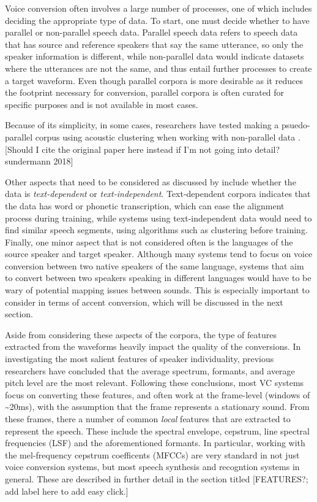 \documentclass
[
    a4paper,
    twoside,
    12pt
]
{report}
\begin{document}
Voice conversion often involves a large number of processes, one of
which includes deciding the appropriate type of data. To start, one must
decide whether to have parallel or non-parallel speech data. Parallel
speech data refers to speech data that has source and reference speakers
that say the same utterance, so only the speaker information is
different, while non-parallel data would indicate datasets where the
utterances are not the same, and thus entail further processes to create
a target waveform. Even though parallel corpora is more desirable as it
reduces the footprint necessary for conversion, parallel corpora is
often curated for specific purposes and is not available in most cases.

Because of its simplicity, in some cases, researchers have tested making
a psuedo-parallel corpus using acoustic clustering when working with
non-parallel data \parencite{lorenzo-trueba2018}. {[}Should I cite the
original paper here instead if I'm not going into detail? sundermann
2018{]}

Other aspects that need to be considered as discussed by
\textcite{mohammadi2017} include whether the data is
\emph{text-dependent} or \emph{text-independent}. Text-dependent corpora
indicates that the data has word or phonetic transcription, which can
ease the alignment process during training, while systems using
text-independent data would need to find similar speech segments, using
algorithms such as clustering before training. Finally, one minor aspect
that is not considered often is the languages of the source speaker and
target speaker. Although many systems tend to focus on voice conversion
between two native speakers of the same language, systems that aim to
convert between two speakers speaking in different languages would have
to be wary of potential mapping issues between sounds. This is
especially important to consider in terms of accent conversion, which
will be discussed in the next section.

Aside from considering these aspects of the corpora, the type of
features extracted from the waveforms heavily impact the quality of the
conversions. In investigating the most salient features of speaker
individuality, previous researchers have concluded that the average
spectrum, formants, and average pitch level are the most relevant.
Following these conclusions, most VC systems focus on converting these
features, and often work at the frame-level (windows of
\textasciitilde{}20ms), with the assumption that the frame represents a
stationary sound. From these frames, there a number of common
\emph{local} features that are extracted to represent the speech. These
include the spectral envelope, cepstrum, line spectral frequencies (LSF)
and the aforementioned formants. In particular, working with the
mel-frequency cepstrum coefficents (MFCCs) are very standard in not just
voice conversion systems, but most speech synthesis and recogntion
systems in general. These are described in further detail in the section
titled {[}FEATURES?; add label here to add easy click.{]}
\end{document}
